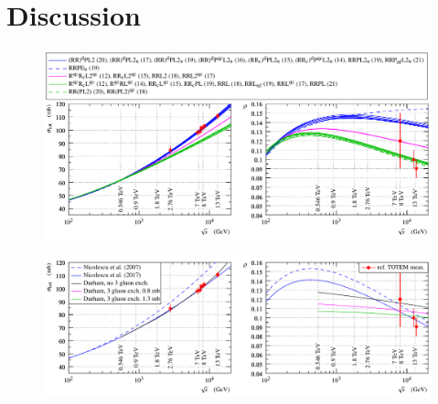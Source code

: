 \section{Discussion}
\label{sec:discussion}




\begin{figure}
\vskip-5mm
\begin{center}
\includegraphics{fig/compete_bands_si_tot_rho.pdf}
\caption{%
}
\label{fig:comp bands}
\end{center}
\end{figure}




\begin{figure}
\vskip-5mm
\begin{center}
\includegraphics{fig/matching_models_si_tot_rho.pdf}
\caption{%
}
\label{fig:match models}
\end{center}
\end{figure}
